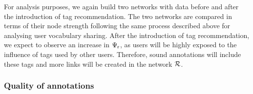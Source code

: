 \begin{itemize}

For analysis purposes, we again build two networks with data before and after the introduction of tag recommendation. The two networks are compared in terms of their node strength following the same process described above for analysing user vocabulary sharing. After the introduction of tag recommendation, we expect to observe an increase in $\Psi_{\text{r}}$, as users will be highly exposed to the influence of tags used by other users. Therefore, sound annotations will include these tags and more links will be created in the network $\mathcal{R}$.

\end{itemize}


\subsubsection{Quality of annotations}
\label{impact:sec:methods_quality_of_annotations}


